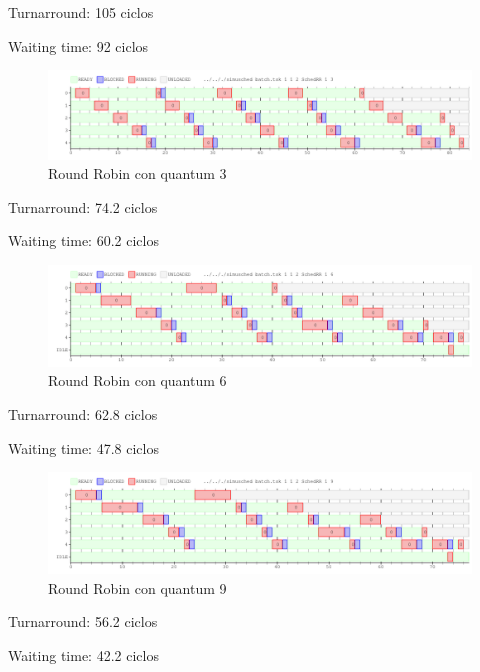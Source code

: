 Turnarround: 105 ciclos

Waiting time: 92 ciclos 

\begin{figure}[H]
\begin{center}
\includegraphics[width=1.1\textwidth]{img/core1q3.png}
     \caption{Round Robin con quantum 3}
\end{center}
\end{figure}

Turnarround: 74.2 ciclos

Waiting time: 60.2 ciclos 

\begin{figure}[H]
\begin{center}
\includegraphics[width=1.1\textwidth]{img/core1q6.png}
     \caption{Round Robin con quantum 6}
\end{center}
\end{figure}

Turnarround: 62.8 ciclos

Waiting time: 47.8 ciclos 

\begin{figure}[H]
\begin{center}
\includegraphics[width=1.1\textwidth]{img/core1q9.png}
     \caption{Round Robin con quantum 9}
\end{center}
\end{figure}

Turnarround: 56.2 ciclos

Waiting time: 42.2 ciclos 

